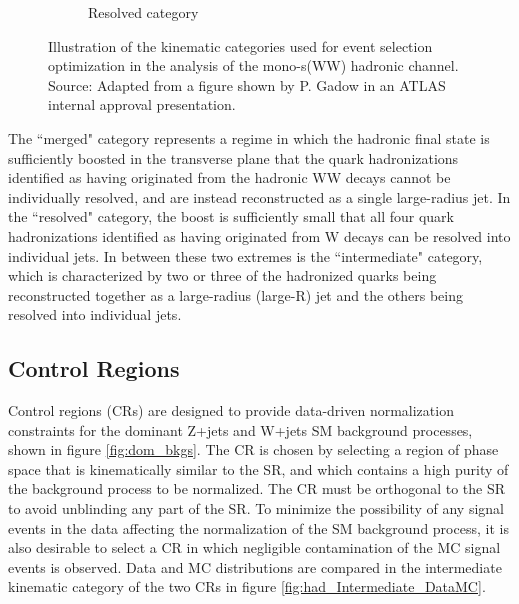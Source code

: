 \documentclass[12pt]{article}
\begin{document}
\begin{figure}[H]
\begin{subfigure}[b]{0.29\textwidth}
         \caption[]{Resolved category}
         \label{fig:had_resolved}
     \end{subfigure}
\caption[]{Illustration of the kinematic categories used for event selection optimization in the analysis of the mono-s(WW) hadronic channel. Source: Adapted from a figure shown by P. Gadow in an ATLAS internal approval presentation. }
\label{fig:had_categories}
\end{figure}

The ``merged" category represents a regime in which the hadronic final state is sufficiently boosted in the transverse plane that the quark hadronizations identified as having originated from the hadronic WW decays cannot be individually resolved, and are instead reconstructed as a single large-radius jet. In the ``resolved" category, the boost is sufficiently small that all four quark hadronizations identified as having originated from W decays can be resolved into individual jets. In between these two extremes is the ``intermediate" category, which is characterized by two or three of the hadronized quarks being reconstructed together as a large-radius (large-R) jet and the others being resolved into individual jets.

\subsection{Control Regions}

Control regions (CRs) are designed to provide data-driven normalization constraints for the dominant Z+jets and W+jets SM background processes, shown in figure \ref{fig:dom_bkgs}. The CR is chosen by selecting a region of phase space that is kinematically similar to the SR, and which contains a high purity of the background process to be normalized. The CR must be orthogonal to the SR to avoid unblinding any part of the SR. To minimize the possibility of any signal events in the data affecting the normalization of the SM background process, it is also desirable to select a CR in which negligible contamination of the MC signal events is observed. Data and MC distributions are compared in the intermediate kinematic category of the two CRs in figure \ref{fig:had_Intermediate_DataMC}. 
\end{document}
